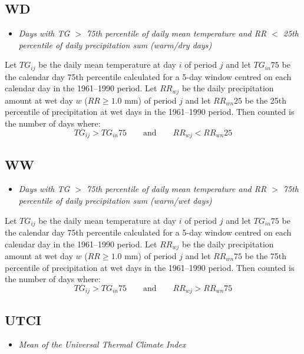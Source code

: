 \documentclass[a4paper,11pt]{article}
\begin{document}
\subsection*{WD}
\begin{itemize}
\item \textit{Days with TG $>$ 75th percentile of daily mean temperature
and RR $<$ 25th percentile of daily precipitation sum (warm/dry days)}
\end{itemize}
Let $TG_{ij}$ be the daily mean temperature at day $i$ of period $j$
and let $TG_{in}75$ be the calendar day 75th percentile calculated for
a 5-day window centred on each calendar day in the 1961--1990
period. Let $RR_{wj}$ be the daily precipitation amount at wet day $w$
($RR\geq1.0$ mm) of period $j$ and let $RR_{wn}25$ be the 25th
percentile of precipitation at wet days in the 1961--1990 period. Then
counted is the number of days where:
\begin{equation*}
TG_{ij} > TG_{in}75 \qquad \textrm{and} \qquad RR_{wj} < RR_{wn}25
\end{equation*}

\subsection*{WW}
\begin{itemize}
\item \textit{Days with TG $>$ 75th percentile of daily mean temperature 
and RR $>$ 75th percentile of daily precipitation sum (warm/wet days)}
\end{itemize}
Let $TG_{ij}$ be the daily mean temperature at day $i$ of period $j$
and let $TG_{in}75$ be the calendar day 75th percentile calculated for
a 5-day window centred on each calendar day in the 1961--1990
period. Let $RR_{wj}$ be the daily precipitation amount at wet day $w$
($RR\geq1.0$ mm) of period $j$ and let $RR_{wn}75$ be the 75th
percentile of precipitation at wet days in the 1961--1990 period. Then
counted is the number of days where:
\begin{equation*}
TG_{ij} > TG_{in}75 \qquad \textrm{and} \qquad RR_{wj} > RR_{wn}75
\end{equation*}

\subsection*{UTCI}
\begin{itemize}
\item \textit{Mean of the Universal Thermal Climate Index}
\end{itemize}
\end{document}
